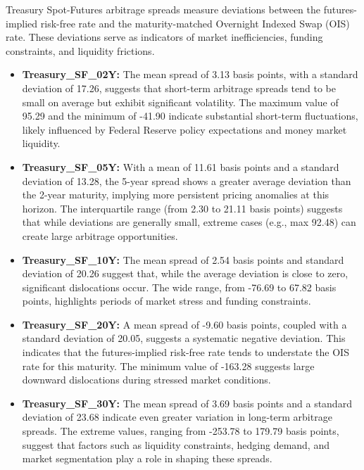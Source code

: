 \documentclass{article}
\begin{document}
Treasury Spot-Futures arbitrage spreads measure deviations between the futures-implied risk-free rate and the maturity-matched Overnight Indexed Swap (OIS) rate. These deviations serve as indicators of market inefficiencies, funding constraints, and liquidity frictions.

\begin{itemize}
    \item \textbf{Treasury\_SF\_02Y:} The mean spread of 3.13 basis points, with a standard deviation of 17.26, suggests that short-term arbitrage spreads tend to be small on average but exhibit significant volatility. The maximum value of 95.29 and the minimum of -41.90 indicate substantial short-term fluctuations, likely influenced by Federal Reserve policy expectations and money market liquidity.

    \item \textbf{Treasury\_SF\_05Y:} With a mean of 11.61 basis points and a standard deviation of 13.28, the 5-year spread shows a greater average deviation than the 2-year maturity, implying more persistent pricing anomalies at this horizon. The interquartile range (from 2.30 to 21.11 basis points) suggests that while deviations are generally small, extreme cases (e.g., max 92.48) can create large arbitrage opportunities.

    \item \textbf{Treasury\_SF\_10Y:} The mean spread of 2.54 basis points and standard deviation of 20.26 suggest that, while the average deviation is close to zero, significant dislocations occur. The wide range, from -76.69 to 67.82 basis points, highlights periods of market stress and funding constraints.

    \item \textbf{Treasury\_SF\_20Y:} A mean spread of -9.60 basis points, coupled with a standard deviation of 20.05, suggests a systematic negative deviation. This indicates that the futures-implied risk-free rate tends to understate the OIS rate for this maturity. The minimum value of -163.28 suggests large downward dislocations during stressed market conditions.

    \item \textbf{Treasury\_SF\_30Y:} The mean spread of 3.69 basis points and a standard deviation of 23.68 indicate even greater variation in long-term arbitrage spreads. The extreme values, ranging from -253.78 to 179.79 basis points, suggest that factors such as liquidity constraints, hedging demand, and market segmentation play a role in shaping these spreads.
\end{itemize}
\end{document}
